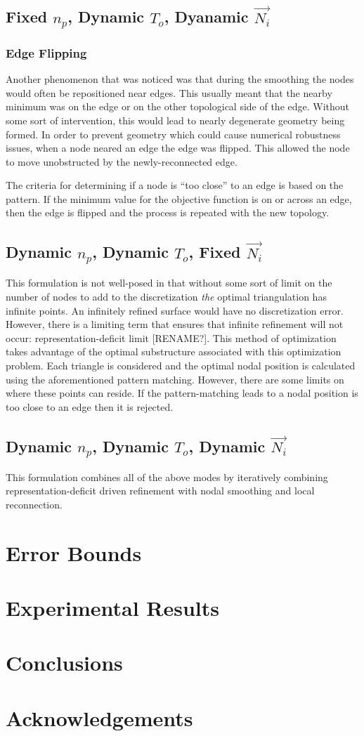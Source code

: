 \documentclass[11pt]{article}
\begin{document}
\subsection{Fixed $n_p$, Dynamic $T_o$, Dyanamic $\vec{N_i}$}
\subsubsection{Edge Flipping}
Another phenomenon that was noticed was that during the smoothing the
nodes would often be repositioned near edges. This usually meant that
the nearby minimum was on the edge or on the other topological side of
the edge. Without some sort of intervention, this would lead to nearly
degenerate geometry being formed. In order to prevent geometry which
could cause numerical robustness issues, when a node neared an edge the
edge was flipped. This allowed the node to move unobstructed by the
newly-reconnected edge.

The criteria for determining if a node is ``too close'' to an edge is
based on the pattern. If the minimum value for the objective function is
on or across an edge, then the edge is flipped and the process is
repeated with the new topology.

\subsection{Dynamic $n_p$, Dynamic $T_o$, Fixed $\vec{N_i}$}
This formulation is not well-posed in that without some sort of limit on
the number of nodes to add to the discretization {\it the} optimal
triangulation has infinite points. An infinitely refined surface would
have no discretization error. However, there is a limiting term that
ensures that infinite refinement will not occur: representation-deficit
limit [RENAME?]. This method of optimization takes advantage of the
optimal substructure associated with this optimization problem. Each
triangle is considered and the optimal nodal position is calculated
using the aforementioned pattern matching. However, there are some
limits on where these points can reside. If the pattern-matching leads
to a nodal position is too close to an edge then it is rejected.

\subsection{Dynamic $n_p$, Dynamic $T_o$, Dynamic $\vec{N_i}$}
This formulation combines all of the above modes by iteratively
combining representation-deficit driven refinement with nodal smoothing
and local reconnection.

\section{Error Bounds}
\section{Experimental Results}
\section{Conclusions}
\section{Acknowledgements}
\end{document}
